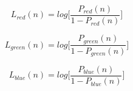 
\begin{equation}\label{eq:octomap_red}
  L_{red}(n) = log \biggl[ \frac{P_{red}(n)}{1-P_{red}(n)} \biggr]
\end{equation}

\begin{equation}\label{eq:octomap_green}
  L_{green}(n) = log \biggl[ \frac{P_{green}(n)}{1-P_{green}(n)} \biggr]
\end{equation}

\begin{equation}\label{eq:octomap_blue}
  L_{blue}(n) = log \biggl[ \frac{P_{blue}(n)}{1-P_{blue}(n)} \biggr]
\end{equation}
